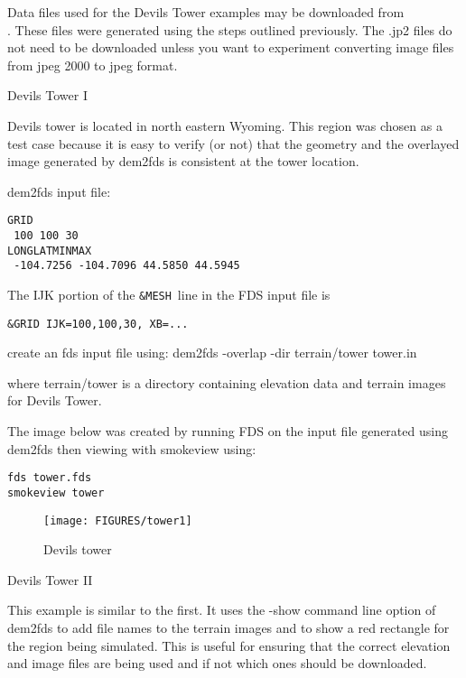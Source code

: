 
Data files used for the Devils Tower examples may be downloaded from \\
.
These files were generated using the steps outlined previously.
The .jp2 files do not need to be downloaded unless you want to experiment converting image files from jpeg 2000 to jpeg format.

Devils Tower I

Devils tower is located in north eastern Wyoming.
This region was chosen as a test case because it is easy to verify (or not) that the geometry and the
overlayed image generated by dem2fds is consistent at the tower location.

dem2fds input file:
\begin{verbatim}
GRID
 100 100 30
LONGLATMINMAX
 -104.7256 -104.7096 44.5850 44.5945
\end{verbatim}

The IJK portion of the {\tt \&MESH}\ line in the FDS input file is

\begin{verbatim}
&GRID IJK=100,100,30, XB=...
\end{verbatim}

create an fds input file using:
dem2fds -overlap -dir terrain/tower tower.in

where terrain/tower is a directory containing elevation data and terrain images for Devils Tower.

The image below was created by running FDS on the input file generated using dem2fds then viewing with smokeview using:

\begin{verbatim}
fds tower.fds
smokeview tower
\end{verbatim}

\begin{figure}[bph]
\centerline{
\texttt{[image: FIGURES/tower1]}}
 \caption[FDS file overview]{Devils tower }
\label{devilstower}%
\end{figure}


Devils Tower II

This example is similar to the first. It uses the -show command line option of dem2fds to add file names
to the terrain images and to show a red rectangle for the region being simulated.
This is useful for ensuring that the correct elevation and image files are being used and if not which ones should be downloaded.

